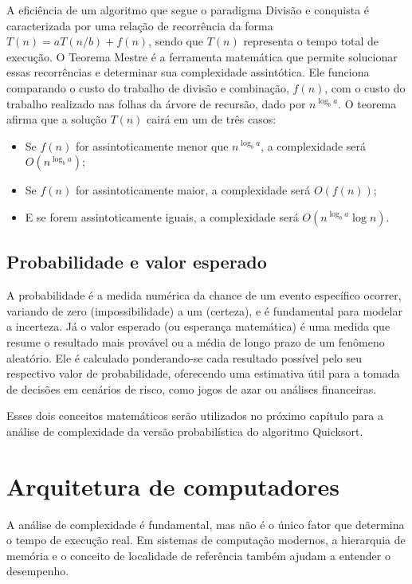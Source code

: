 A eficiência de um algoritmo que segue o paradigma Divisão e conquista é caracterizada por uma relação de recorrência da forma $T(n) = aT(n/b) + f(n)$, sendo que $T(n)$ representa o tempo total de execução. O Teorema Mestre é a ferramenta matemática que permite solucionar essas recorrências e determinar sua complexidade assintótica. Ele funciona comparando o custo do trabalho de divisão e combinação, $f(n)$, com o custo do trabalho realizado nas folhas da árvore de recursão, dado por $n^{\log_b a}$. O teorema afirma que a solução $T(n)$ cairá em um de três casos:
\begin{itemize}
    \item Se $f(n)$ for assintoticamente menor que $n^{\log_b a}$, a complexidade será $O(n^{\log_b a})$;
    \item Se $f(n)$ for assintoticamente maior, a complexidade será $O(f(n))$;
    \item E se forem assintoticamente iguais, a complexidade será $O(n^{\log_b a} \log n)$.
\end{itemize}  

\subsection{Probabilidade e valor esperado}
A probabilidade é a medida numérica da chance de um evento específico ocorrer, variando de zero (impossibilidade) a um (certeza), e é fundamental para modelar a incerteza. Já o valor esperado (ou esperança matemática) é uma medida que resume o resultado mais provável ou a média de longo prazo de um fenômeno aleatório. Ele é calculado ponderando-se cada resultado possível pelo seu respectivo valor de probabilidade, oferecendo uma estimativa útil para a tomada de decisões em cenários de risco, como jogos de azar ou análises financeiras.

Esses dois conceitos matemáticos serão utilizados no próximo capítulo para a análise de complexidade da versão probabilística do algoritmo Quicksort.

\section{Arquitetura de computadores}\label{sec:arquitetura}
A análise de complexidade  é fundamental, mas não é o único fator que determina o tempo de execução real. Em sistemas de computação modernos, a hierarquia de memória e o conceito de localidade de referência também ajudam a entender o desempenho.

